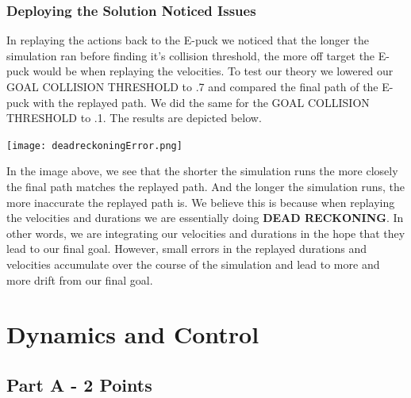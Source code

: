 \documentclass{article}
\numberwithin{equation}{section} %
\numberwithin{figure}{section} %
\numberwithin{table}{section} %
\begin{document}
\begin{framed}
\subsubsection{Deploying the Solution Noticed Issues}
In replaying the actions back to the E-puck we noticed that the longer the simulation ran before finding it's collision threshold, the more off target the E-puck would be when replaying the velocities. To test our theory we lowered our GOAL COLLISION THRESHOLD to .7 and compared the final path of the E-puck with the replayed path.  We did the same for the GOAL COLLISION THRESHOLD to .1.  The results are depicted below.

\begin{center}
\texttt{[image: deadreckoningError.png]}
\end{center}

In the image above, we see that the shorter the simulation runs the more closely the final path matches the replayed path.  And the longer the simulation runs, the more inaccurate the replayed path is.  We believe this is because when replaying the velocities and durations we are essentially doing \textbf{DEAD RECKONING}.  In other words, we are integrating our velocities and durations in the hope that they lead to our final goal.  However, small errors in the replayed durations and velocities accumulate over the course of the simulation and lead to more and more drift from our final goal. 

\end{framed}

\section{Dynamics and Control}

\begin{framed}
\subsection{ Part A - 2 Points}
\label{sec:DynAndCtrl}
\end{framed}
\end{document}
